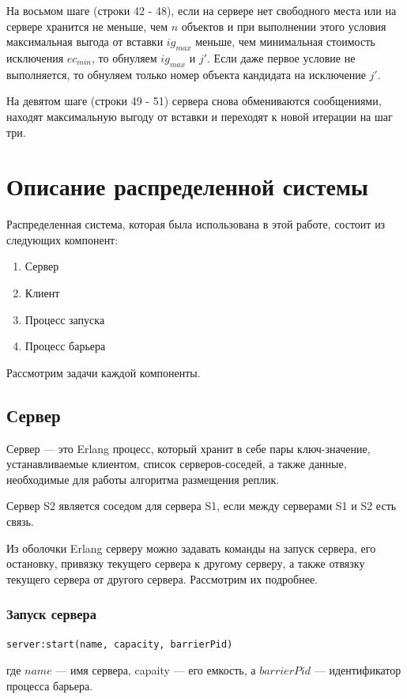 			На восьмом шаге (строки 42 - 48), если на сервере нет свободного места или на сервере хранится 
			не меньше, чем $n$ объектов и при выполнении этого условия максимальная выгода от вставки $ig_{max}$ меньше, чем минимальная стоимость 
			исключения $ec_{min}$, то обнуляем $ig_{max}$ и $j'$. Если даже первое условие не выполняется, то обнуляем только номер объекта 
			кандидата на исключение $j'$. 
			
			На девятом шаге (строки 49 - 51) сервера снова обмениваются сообщениями, находят максимальную выгоду от вставки и
			переходят к новой итерации на шаг три.
\newpage

\chapter{Описание распределенной системы}
	Распределенная система, которая была использована в этой работе, состоит из следующих компонент:
	\begin{enumerate}
		\item Сервер
		\item Клиент
		\item Процесс запуска
		\item Процесс барьера
	\end{enumerate}
	Рассмотрим задачи каждой компоненты.

	\section{Сервер}
		Сервер --- это Erlang процесс, который хранит в себе пары ключ-значение, устанавливаемые клиентом, список серверов-соседей, а также
		данные, необходимые для работы алгоритма размещения реплик. 
		
		Сервер S2 является соседом для сервера S1, если между серверами S1 и S2 есть связь.
		
		Из оболочки Erlang серверу можно задавать команды на запуск сервера, его остановку,
		привязку текущего сервера к другому серверу, а также отвязку текущего сервера от другого сервера. Рассмотрим их подробнее.

		\subsection{Запуск сервера}
			\begin{lstlisting}
server:start(name, capacity, barrierPid)
			\end{lstlisting}
			где $name$ --- имя сервера, capaity --- его емкость, а $barrierPid$ --- идентификатор процесса барьера.
			
